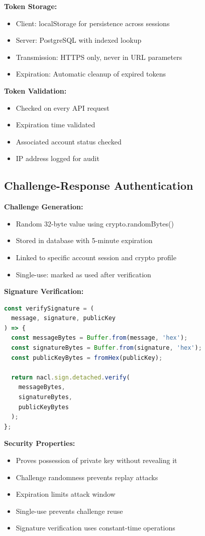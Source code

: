 \textbf{Token Storage:}
\begin{itemize}
    \item Client: localStorage for persistence across sessions
    \item Server: PostgreSQL with indexed lookup
    \item Transmission: HTTPS only, never in URL parameters
    \item Expiration: Automatic cleanup of expired tokens
\end{itemize}

\textbf{Token Validation:}
\begin{itemize}
    \item Checked on every API request
    \item Expiration time validated
    \item Associated account status checked
    \item IP address logged for audit
\end{itemize}

\subsection{Challenge-Response Authentication}

\textbf{Challenge Generation:}
\begin{itemize}
    \item Random 32-byte value using crypto.randomBytes()
    \item Stored in database with 5-minute expiration
    \item Linked to specific account session and crypto profile
    \item Single-use: marked as used after verification
\end{itemize}

\textbf{Signature Verification:}
\begin{lstlisting}[language=JavaScript]
const verifySignature = (
  message, signature, publicKey
) => {
  const messageBytes = Buffer.from(message, 'hex');
  const signatureBytes = Buffer.from(signature, 'hex');
  const publicKeyBytes = fromHex(publicKey);
  
  return nacl.sign.detached.verify(
    messageBytes,
    signatureBytes,
    publicKeyBytes
  );
};
\end{lstlisting}

\textbf{Security Properties:}
\begin{itemize}
    \item Proves possession of private key without revealing it
    \item Challenge randomness prevents replay attacks
    \item Expiration limits attack window
    \item Single-use prevents challenge reuse
    \item Signature verification uses constant-time operations
\end{itemize}

